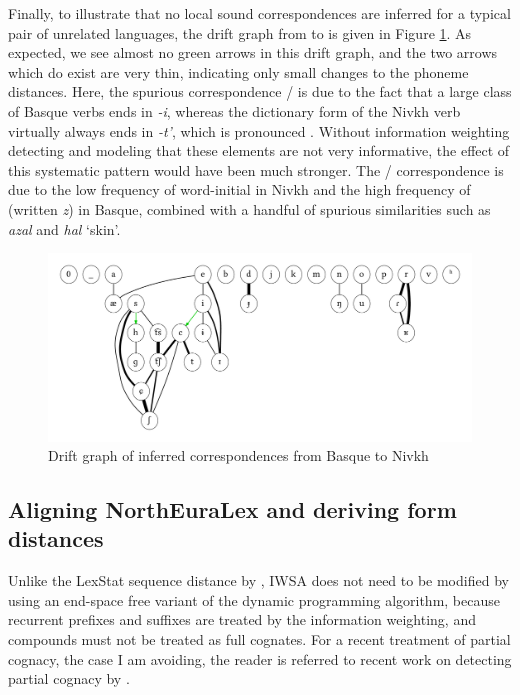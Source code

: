 Finally, to illustrate that no local sound correspondences are inferred for a typical pair of unrelated languages, the drift graph from  to  is given in Figure \ref{fig:driftGraphEuNiv}. As expected, we see almost no green arrows in this drift graph, and the two arrows which do exist are very thin, indicating only small changes to the phoneme distances. Here, the spurious correspondence \ipa{[i]}/\ipa{[c]} is due to the fact that a large class of Basque verbs ends in \textit{-i}, whereas the dictionary form of the Nivkh verb virtually always ends in \textit{-t'}, which is pronounced \ipa{[c]}. Without information weighting detecting and modeling that these elements are not very informative, the effect of this systematic pattern would have been much stronger. The \ipa{[s]}/\ipa{[h]} correspondence is due to the low frequency of word-initial \ipa{[h]} in Nivkh and the high frequency of \ipa{[s]} (written \textit{z}) in Basque, combined with a handful of spurious similarities such as \textit{azal} and \textit{hal} `skin'.

\begin{figure}[h!]
    \includegraphics[width=\textwidth]{figures/drift-graph-eu-niv.pdf}
    \caption{Drift graph of inferred correspondences from Basque to Nivkh}
    \label{fig:driftGraphEuNiv}
\end{figure}

\subsection{Aligning NorthEuraLex and deriving form distances}

Unlike the LexStat sequence distance by \cite{list2012}, IWSA does not need to be modified by using an end-space free variant of the dynamic programming algorithm, because recurrent prefixes and suffixes are treated by the information weighting, and compounds must not be treated as full cognates. For a recent treatment of partial cognacy, the case I am avoiding, the reader is referred to recent work on detecting partial cognacy by \cite{list_ea_2016}.

